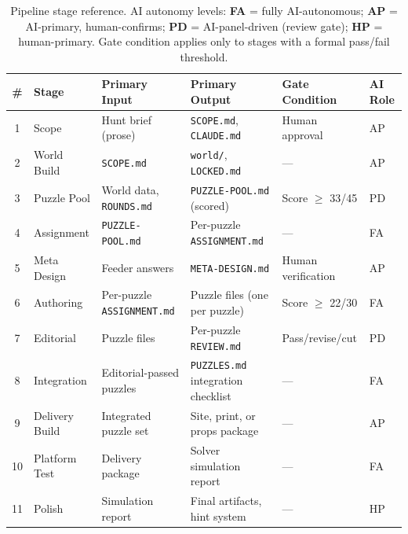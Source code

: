 \begin{table}[h]
\centering
\caption{Pipeline stage reference. AI autonomy levels: \textbf{FA} = fully AI-autonomous;
\textbf{AP} = AI-primary, human-confirms; \textbf{PD} = AI-panel-driven (review gate);
\textbf{HP} = human-primary. Gate condition applies only to stages with a formal pass/fail
threshold.}
\label{tab:stages}
\small
\begin{tabular}{clllll}
\toprule
\textbf{\#} & \textbf{Stage} & \textbf{Primary Input} & \textbf{Primary Output} &
\textbf{Gate Condition} & \textbf{AI Role} \\
\midrule
1 & Scope         & Hunt brief (prose)           & \texttt{SCOPE.md}, \texttt{CLAUDE.md}       & Human approval      & AP \\
2 & World Build   & \texttt{SCOPE.md}            & \texttt{world/}, \texttt{LOCKED.md}         & ---                 & AP \\
3 & Puzzle Pool   & World data, \texttt{ROUNDS.md} & \texttt{PUZZLE-POOL.md} (scored)           & Score $\geq$ 33/45  & PD \\
4 & Assignment    & \texttt{PUZZLE-POOL.md}      & Per-puzzle \texttt{ASSIGNMENT.md}           & ---                 & FA \\
5 & Meta Design   & Feeder answers               & \texttt{META-DESIGN.md}                     & Human verification  & AP \\
6 & Authoring     & Per-puzzle \texttt{ASSIGNMENT.md} & Puzzle files (one per puzzle)          & Score $\geq$ 22/30  & FA \\
7 & Editorial     & Puzzle files                 & Per-puzzle \texttt{REVIEW.md}               & Pass/revise/cut     & PD \\
8 & Integration   & Editorial-passed puzzles     & \texttt{PUZZLES.md} integration checklist   & ---                 & FA \\
9 & Delivery Build & Integrated puzzle set        & Site, print, or props package               & ---                 & AP \\
10 & Platform Test & Delivery package             & Solver simulation report                    & ---                 & FA \\
11 & Polish        & Simulation report            & Final artifacts, hint system                & ---                 & HP \\
\bottomrule
\end{tabular}
\end{table}

